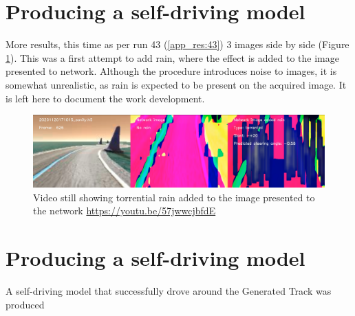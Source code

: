 
\section{Producing a self-driving model}


More results, this time as per run 43 (\ref{app_res:43}) 3 images side by side (Figure 
 \ref{fig:tcpflow_Run43}). This was a first attempt to add rain, where the effect is added to the image presented to network. Although the procedure introduces noise to images, it is somewhat unrealistic, as rain is expected to be present on the acquired image. It is left here to document the work development.
 
\begin{figure}[ht]
 \centering 
 \includegraphics[width=\textwidth]{Figures/tcpflow_Run43.png}
 \caption{Video still showing torrential rain added to the image presented to the network \href{https://youtu.be/57jwwcjbfdE}{https://youtu.be/57jwwcjbfdE}}
 \label{fig:tcpflow_Run43} 
\end{figure}

\section{Producing a self-driving model}
A self-driving model that successfully drove around the Generated Track was produced 


